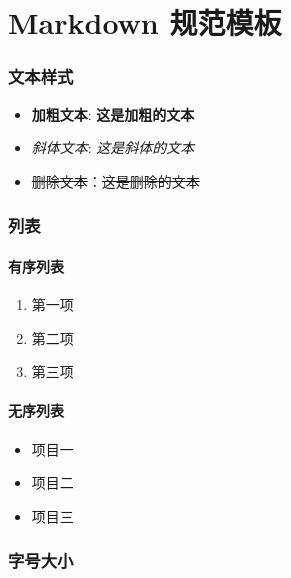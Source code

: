 \documentclass[UTF-8]{article}
\begin{document}
\part{Markdown 规范模板}

\section{文本样式}

\begin{itemize}

    \item \textbf{加粗文本}: \textbf{这是加粗的文本}
    \item \textit{斜体文本}: \textit{这是斜体的文本}
    \item \sout{删除文本}：\sout{这是删除的文本}

\end{itemize}

\section{列表}

\subsection{有序列表}

\begin{enumerate}

    \item 第一项
    \item 第二项
    \item 第三项

\end{enumerate}

\subsection{无序列表}

\begin{itemize}

    \item 项目一
    \item 项目二
    \item 项目三

\end{itemize}

\section{字号大小}
\end{document}
